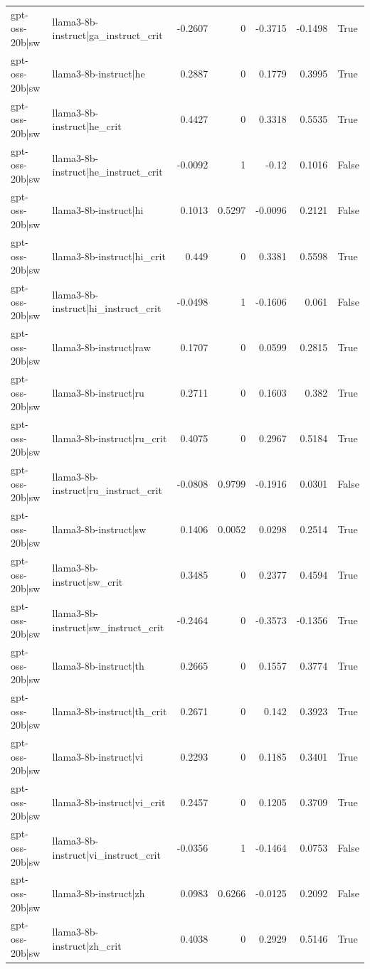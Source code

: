 \begin{table}
\begin{tabular}{l l r r r r l}
gpt-oss-20b|sw & llama3-8b-instruct|ga_instruct_crit & -0.2607 & 0 & -0.3715 & -0.1498 & True \\
gpt-oss-20b|sw & llama3-8b-instruct|he & 0.2887 & 0 & 0.1779 & 0.3995 & True \\
gpt-oss-20b|sw & llama3-8b-instruct|he_crit & 0.4427 & 0 & 0.3318 & 0.5535 & True \\
gpt-oss-20b|sw & llama3-8b-instruct|he_instruct_crit & -0.0092 & 1 & -0.12 & 0.1016 & False \\
gpt-oss-20b|sw & llama3-8b-instruct|hi & 0.1013 & 0.5297 & -0.0096 & 0.2121 & False \\
gpt-oss-20b|sw & llama3-8b-instruct|hi_crit & 0.449 & 0 & 0.3381 & 0.5598 & True \\
gpt-oss-20b|sw & llama3-8b-instruct|hi_instruct_crit & -0.0498 & 1 & -0.1606 & 0.061 & False \\
gpt-oss-20b|sw & llama3-8b-instruct|raw & 0.1707 & 0 & 0.0599 & 0.2815 & True \\
gpt-oss-20b|sw & llama3-8b-instruct|ru & 0.2711 & 0 & 0.1603 & 0.382 & True \\
gpt-oss-20b|sw & llama3-8b-instruct|ru_crit & 0.4075 & 0 & 0.2967 & 0.5184 & True \\
gpt-oss-20b|sw & llama3-8b-instruct|ru_instruct_crit & -0.0808 & 0.9799 & -0.1916 & 0.0301 & False \\
gpt-oss-20b|sw & llama3-8b-instruct|sw & 0.1406 & 0.0052 & 0.0298 & 0.2514 & True \\
gpt-oss-20b|sw & llama3-8b-instruct|sw_crit & 0.3485 & 0 & 0.2377 & 0.4594 & True \\
gpt-oss-20b|sw & llama3-8b-instruct|sw_instruct_crit & -0.2464 & 0 & -0.3573 & -0.1356 & True \\
gpt-oss-20b|sw & llama3-8b-instruct|th & 0.2665 & 0 & 0.1557 & 0.3774 & True \\
gpt-oss-20b|sw & llama3-8b-instruct|th_crit & 0.2671 & 0 & 0.142 & 0.3923 & True \\
gpt-oss-20b|sw & llama3-8b-instruct|vi & 0.2293 & 0 & 0.1185 & 0.3401 & True \\
gpt-oss-20b|sw & llama3-8b-instruct|vi_crit & 0.2457 & 0 & 0.1205 & 0.3709 & True \\
gpt-oss-20b|sw & llama3-8b-instruct|vi_instruct_crit & -0.0356 & 1 & -0.1464 & 0.0753 & False \\
gpt-oss-20b|sw & llama3-8b-instruct|zh & 0.0983 & 0.6266 & -0.0125 & 0.2092 & False \\
gpt-oss-20b|sw & llama3-8b-instruct|zh_crit & 0.4038 & 0 & 0.2929 & 0.5146 & True \\

\end{tabular}
\end{table}
